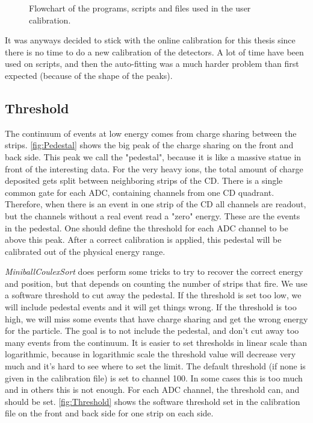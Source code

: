 \documentclass[twoside,english]{uiofysmaster/uiofysmaster}
\begin{document}
\begin{figure}[ht]
	\centering
	
	\caption{Flowchart of the programs, scripts and files used in the user calibration.}
	\label{fig:cal_FC}
\end{figure}



It was anyways decided to stick with the online calibration for this thesis since there is no time to do a new calibration of the detectors. 
A lot of time have been used on scripts, and then the auto-fitting was a much harder problem than first expected (because of the shape of the peaks). 



\subsection{Threshold}
The continuum of events at low energy comes from charge sharing between the strips.
 \autoref{fig:Pedestal} shows the big peak of the charge sharing on the front and back side. 
 This peak we call the "pedestal", because it is like a massive statue in front of the interesting data. 
 For the very heavy ions, the total amount of charge deposited gets split between neighboring strips of the CD. 
There is a single common gate for each ADC, containing channels from one CD quadrant. 
Therefore, when there is an event in one strip of the CD all channels are readout, but the channels without a real event read a "zero" energy.
These are the events in the pedestal.
One should define the threshold for each ADC channel to be above this peak.
After a correct calibration is applied, this pedestal will be calibrated out of the physical energy range.

\textsl{MiniballCoulexSort} does perform some tricks to try to recover the correct energy and position, but that depends on counting the number of strips that fire. 
We use a software threshold to cut away the pedestal. 
If the threshold is set too low, we will include pedestal events and it will get things wrong. 
If the threshold is too high, we will miss some events that have charge sharing and get the wrong energy for the particle. 
The goal is to not include the pedestal, and don't cut away too many events from the continuum.
It is easier to set thresholds in linear scale than logarithmic, because in logarithmic scale the threshold value will decrease very much and it's hard to see where to set the limit. 
The default threshold (if none is given in the calibration file) is set to channel 100. 
In some cases this is too much and in others this is not enough. 
For each ADC channel, the threshold can, and should be set. 
\autoref{fig:Threshold} shows the software threshold set in the calibration file on the front and back side for one strip on each side.
\end{document}
